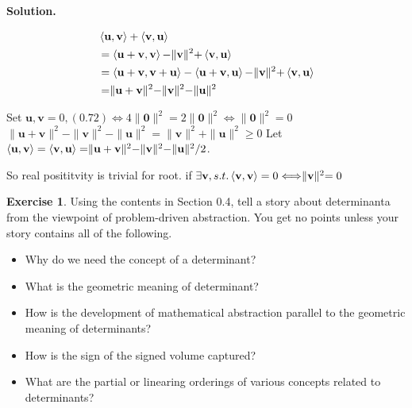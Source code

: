 \documentclass[a4paper]{book}
\newenvironment{solution}%
{\noindent\textbf{Solution.}}%
{\qedhere}
\numberwithin{equation}{chapter}
\theoremstyle{definition}
\newtheorem{exc}[exm]{Exercise}
\begin{document}
\begin{multicols}{2}
\begin{solution}
\begin{itemize}
		\begin{equation}
			\begin{aligned}
			&\braket{\mathbf{u,v}} + \braket{\mathbf{v,u}}\\
			&=\braket{\mathbf{u+v,v}} - \rVert\mathbf{v}\lVert^2 +\braket{\mathbf{v,u}} \\
			&=\braket{\mathbf{u+v,v+u}}-\braket{\mathbf{u+v,u}} -
			\rVert\mathbf{v}\lVert^2 + \braket{\mathbf{v,u}}\\
			&=\rVert\mathbf{u+v}\lVert^2 - \rVert\mathbf{v}\lVert^2 -\rVert\mathbf{u}\lVert^2
			\end{aligned}
		\end{equation}
		
		Set $\mathbf{u,v} = 0, (0.72) \Longleftrightarrow 4\rVert\mathbf{0}\lVert^2 = 2\rVert\mathbf{0}\lVert^2 \Longleftrightarrow \rVert\mathbf{0}\lVert^2 = 0$
		$\rVert\mathbf{u+v}\lVert^2 - \rVert\mathbf{v}\lVert^2 -\rVert\mathbf{u}\lVert^2 = \rVert\mathbf{v}\lVert^2 +\rVert\mathbf{u}\lVert^2 \geq 0$
		Let $\braket{\mathbf{u,v}} = \braket{\mathbf{v,u}} = \rVert\mathbf{u+v}\lVert^2 - \rVert\mathbf{v}\lVert^2 -\rVert\mathbf{u}\lVert^2/2$.
		
		So real posititvity is trivial for root. if $\exists \mathbf{v},s.t. \braket{\mathbf{v,v}} = 0 \Longleftrightarrow \rVert\mathbf{v}\lVert^2 = 0 $
		\end{itemize}
\end{solution}


\begin{exc}
	Using the contents in Section 0.4, tell a story about determinanta from the viewpoint of problem-driven abstraction. You get no points unless your story contains all of the following.
	\begin{itemize}
		\item [(1)] Why do we need the concept of a determinant?
		\item [(2)] What is the geometric meaning of determinant?
		\item [(3)] How is the development of mathematical abstraction parallel to the geometric meaning of determinants?
		\item [(4)] How is the sign of the signed volume captured?
		\item [(5)] What are the partial or linearing orderings of various concepts related to determinants?
	\end{itemize}
\end{exc}


\end{multicols}
\end{document}
